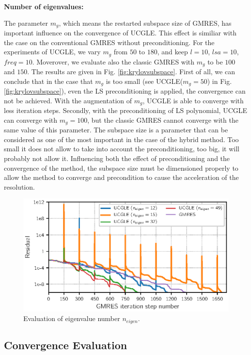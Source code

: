 \textbf{Number of eigenvalues: }

The parameter $m_g$, which means the restarted subspace size of GMRES, has important influence on the convergence of UCGLE.  This effect is similiar with the case on the conventional GMRES without preconditioning. For the experiments of UCGLE, we vary $m_g$ from $50$ to $180$, and keep $l=10$, $lsa=10$, $freq=10$. Moverover, we evaluate also the classic GMRES with $m_g$ to be $100$ and $150$. The results are given in Fig. \ref{fig:krylovsubspace}. First of all, we can conclude that in the case that $m_g$ is too small (see UCGLE($m_g=50$) in  Fig. \ref{fig:krylovsubspace}), even the LS preconditioning is applied, the convergence can not be achieved. With the augmentation of $m_g$, UCGLE is able to converge with less iteration steps. Secondly, with the preconditioning of LS polynomial, UCGLE can converge with $m_g=100$, but the classic GMRES cannot converge with the same value of this parameter.
The subspace size is a parameter that can be considered as one of the most important in the case of the hybrid method. Too small it does not allow to take into account the preconditioning, too big, it will probably not allow it. Influencing both the effect of preconditioning and the convergence of the method, the subspace size must be dimensioned properly to allow the method to converge and precondition to cause the acceleration of the resolution.

\begin{figure}[htbp]
	\centering
	\includegraphics[width=6.2in]{fig/conv_eigenvalues.eps}
	\caption{Evaluation of eigenvalue number $n_{eigen}$.}
	\label{fig:vals}
\end{figure}

\subsection{Convergence Evaluation}

